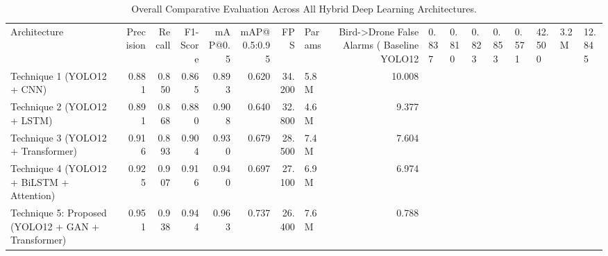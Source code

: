 \begin{table}
\caption{Overall Comparative Evaluation Across All Hybrid Deep Learning Architectures.}
\label{tab:master_benchmark}
\begin{tabular}{lrrrrrrlr}
\toprule
Architecture & Precision & Recall & F1-Score & mAP@0.5 & mAP@0.5:0.95 & FPS & Params & Bird->Drone False Alarms (%
\midrule
Baseline YOLO12 & 0.837 & 0.810 & 0.823 & 0.853 & 0.571 & 42.500 & 3.2M & 12.845 \\
Technique 1 (YOLO12 + CNN) & 0.881 & 0.850 & 0.865 & 0.893 & 0.620 & 34.200 & 5.8M & 10.008 \\
Technique 2 (YOLO12 + LSTM) & 0.891 & 0.868 & 0.880 & 0.908 & 0.640 & 32.800 & 4.6M & 9.377 \\
Technique 3 (YOLO12 + Transformer) & 0.916 & 0.893 & 0.904 & 0.930 & 0.679 & 28.500 & 7.4M & 7.604 \\
Technique 4 (YOLO12 + BiLSTM + Attention) & 0.925 & 0.907 & 0.916 & 0.940 & 0.697 & 27.100 & 6.9M & 6.974 \\
Technique 5: Proposed (YOLO12 + GAN + Transformer) & 0.951 & 0.938 & 0.944 & 0.963 & 0.737 & 26.400 & 7.6M & 0.788 \\
\bottomrule
\end{tabular}
\end{table}
